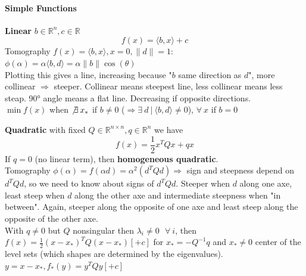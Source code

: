 \documentclass[10pt]{report}
\begin{document}
\paragraph{Simple Functions} \begin{list}{}{}
	\item \textbf{Linear} $b \in \mathbb{R}^n, c\in \mathbb{R}$ $$f(x) = \langle b,x\rangle + c$$
	Tomography $f(x) = \langle b,x\rangle, x = 0, \|d\|=1$: $\phi(\alpha) = \alpha\langle b, d\rangle = \alpha\|b\|\cos(\theta)$\\
	Plotting this gives a line, increasing because "$b$ same direction as $d$", more collinear $\Rightarrow$ steeper. Collinear means steepest line, less collinear means less steap. 90° angle means a flat line. Decreasing if opposite directions.\\
	$\min f(x)$ when $\not\exists\:x_*$ if $b \neq 0$ ($\Rightarrow \exists\: d\:|\:\langle b,d\rangle \neq 0$), $\forall\:x$ if $b = 0$
	\item \textbf{Quadratic} with fixed $Q\in \mathbb{R}^{n\times n}, q\in \mathbb{R}^n$ we have $$f(x) = \frac{1}{2}x^TQx + qx$$
	If $q=0$ (no linear term), then \textbf{homogeneous quadratic}.\\
	Tomography $\phi(\alpha) = f(\alpha d) = \alpha^2(d^TQd)\Rightarrow$ sign and steepness depend on $d^TQd$, so we need to know about signs of $d^TQd$. Steeper when $d$ along one axe, least steep when $d$ along the other axe and intermediate steepness when "in between". Again, steeper along the opposite of one axe and least steep along the opposite of the other axe.\\
	With $q\neq 0$ but $Q$ nonsingular then $\lambda_i\neq 0\:\:\:\forall\:i$, then $f(x)=\frac{1}{2}(x-x_*)^TQ(x-x_*) [+c]$ for $x_* = -Q^{-1}q$ and $x_* \neq 0$ center of the level sets (which shapes are determined by the eigenvalues).\\
	$y = x - x_*, f_*(y) = y^TQy [+c]$
\end{list}
\end{document}
